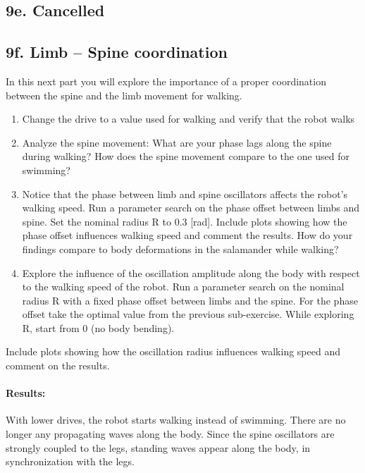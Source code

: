 \documentclass{cmc}
\begin{document}
\subsection*{9e. Cancelled}

\subsection*{9f. Limb – Spine coordination}
\label{sec:limb-spine-coordination}

In this next part you will explore the importance of a proper coordination
between the spine and the limb movement for walking.

\begin{enumerate}
\item Change the drive to a value used for walking and verify that the robot
  walks
\item Analyze the spine movement: What are your phase lags along the spine
  during walking? How does the spine movement compare to the one used for
  swimming?
\item Notice that the phase between limb and spine oscillators affects the
  robot’s walking speed. Run a parameter search on the phase offset between
  limbs and spine. Set the nominal radius R to 0.3 [rad]. Include plots showing
  how the phase offset influences walking speed and comment the results. How do
  your findings compare to body deformations in the salamander while walking?
\item Explore the influence of the oscillation amplitude along the body with
  respect to the walking speed of the robot. Run a parameter search on the
  nominal radius R with a fixed phase offset between limbs and the spine. For
  the phase offset take the optimal value from the previous sub-exercise. While
  exploring R, start from 0 (no body bending).
\end{enumerate}

Include plots showing how the oscillation radius influences walking speed and
comment on the results.

\paragraph{Results:}
With lower drives, the robot starts walking instead of swimming. There are no longer any propagating waves along the body. Since the spine oscillators are strongly coupled to the legs, standing waves appear along the body, in synchronization with the legs. 
\end{document}

